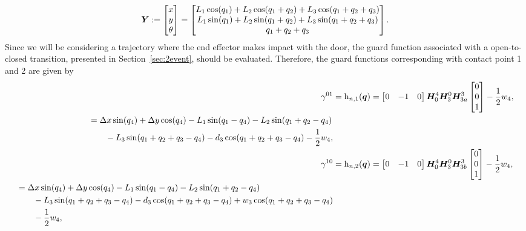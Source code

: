 \documentclass[../DC2019003Bouma.tex]{subfiles}
\begin{document}
\begin{align}
{\boldsymbol{Y}}:=\begin{bmatrix}
x\\y\\ \theta
\end{bmatrix} = \begin{bmatrix}
L_1\cos(q_1) + L_2\cos(q_1+q_2) + L_3\cos(q_1+q_2+q_3)\\
L_1\sin(q_1) + L_2\sin(q_1+q_2) + L_3\sin(q_1+q_2+q_3)\\
q_1+q_2+q_3
\end{bmatrix}.\label{eq:Y}
\end{align}
%
Since we will be considering a trajectory where the end effector makes impact with the door, the guard function associated with a open-to-closed transition, presented in Section~\ref{sec:2event}, should be evaluated. Therefore, the guard functions corresponding with contact point 1 and 2 are given by
\begin{align}
\gamma^{01} &= \mathrm{h}_{n,1}({\boldsymbol{q}}) = \begin{bmatrix} 0 & -1 & 0\end{bmatrix}{\boldsymbol{H}}^4_0{\boldsymbol{H}}^0_3{\boldsymbol{H}}^3_{3a}\begin{bmatrix}0\\0\\1\end{bmatrix}-\frac{1}{2}w_4,\\
\begin{split}
&= \Delta x\sin(q_4) + \Delta y\cos(q_4) - L_1\sin(q_1-q_4) - L_2\sin(q_1+q_2-q_4) \\
&\qquad -L_3\sin(q_1+q_2+q_3-q_4) - d_3\cos(q_1+q_2+q_3-q_4) - \frac{1}{2}w_4,
\end{split}\\
\gamma^{10} &= \mathrm{h}_{n,2}({\boldsymbol{q}}) = \begin{bmatrix} 0 & -1 & 0\end{bmatrix}{\boldsymbol{H}}^4_0{\boldsymbol{H}}^0_3{\boldsymbol{H}}^3_{3b}\begin{bmatrix}0\\0\\1\end{bmatrix}-\frac{1}{2}w_4,\\
\begin{split}
&= \Delta x\sin(q_4) + \Delta y\cos(q_4) - L_1\sin(q_1-q_4) - L_2\sin(q_1+q_2-q_4) \\
&\qquad -L_3\sin(q_1+q_2+q_3-q_4) - d_3\cos(q_1+q_2+q_3-q_4) + w_3\cos(q_1+q_2+q_3-q_4) \\ &\qquad-\frac{1}{2}w_4,
\end{split}
\end{align}
\end{document}
